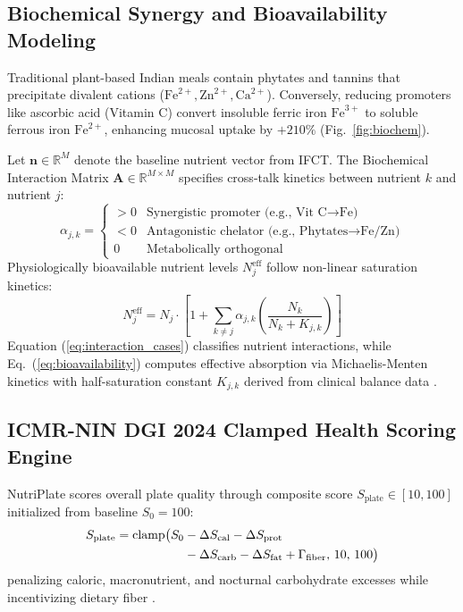 \documentclass[conference]{IEEEtran}
\begin{document}
\subsection{Biochemical Synergy and Bioavailability Modeling}
Traditional plant-based Indian meals contain phytates and tannins that precipitate divalent cations ($\text{Fe}^{2+}, \text{Zn}^{2+}, \text{Ca}^{2+}$). Conversely, reducing promoters like ascorbic acid (Vitamin C) convert insoluble ferric iron $\text{Fe}^{3+}$ to soluble ferrous iron $\text{Fe}^{2+}$, enhancing mucosal uptake by $+210\%$ (Fig.~\ref{fig:biochem}).

Let $\mathbf{n} \in \mathbb{R}^M$ denote the baseline nutrient vector from IFCT. The Biochemical Interaction Matrix $\mathbf{A} \in \mathbb{R}^{M \times M}$ specifies cross-talk kinetics between nutrient $k$ and nutrient $j$:
\begin{equation}
\alpha_{j,k} = \begin{cases}
> 0 & \text{Synergistic promoter (e.g., Vit C} \to \text{Fe)} \\
< 0 & \text{Antagonistic chelator (e.g., Phytates} \to \text{Fe/Zn)} \\
0 & \text{Metabolically orthogonal}
\end{cases}
\label{eq:interaction_cases}
\end{equation}
Physiologically bioavailable nutrient levels $N_j^{\text{eff}}$ follow non-linear saturation kinetics:
\begin{equation}
N_j^{\text{eff}} = N_j \cdot \left[ 1 + \sum_{k \neq j} \alpha_{j,k} \left( \frac{N_k}{N_k + K_{j,k}} \right) \right]
\label{eq:bioavailability}
\end{equation}
Equation (\ref{eq:interaction_cases}) classifies nutrient interactions, while Eq.~(\ref{eq:bioavailability}) computes effective absorption via Michaelis-Menten kinetics with half-saturation constant $K_{j,k}$ derived from clinical balance data \cite{gibson2018phytates, hurrell2010iron, hallberg1989iron, hurrell1999inhibition, lonnerdal2002dietary}.

\subsection{ICMR-NIN DGI 2024 Clamped Health Scoring Engine}
NutriPlate scores overall plate quality through composite score $S_{\text{plate}} \in [10, 100]$ initialized from baseline $S_0 = 100$:
\begin{align}
S_{\text{plate}} = \text{clamp}\big( S_0 & - \Delta S_{\text{cal}} - \Delta S_{\text{prot}} \notag \\
& - \Delta S_{\text{carb}} - \Delta S_{\text{fat}} + \Gamma_{\text{fiber}}, \, 10, \, 100 \big)
\label{eq:smart_score}
\end{align}
penalizing caloric, macronutrient, and nocturnal carbohydrate excesses while incentivizing dietary fiber \cite{icmr2020rda, icmr2024dgi}.
\end{document}
